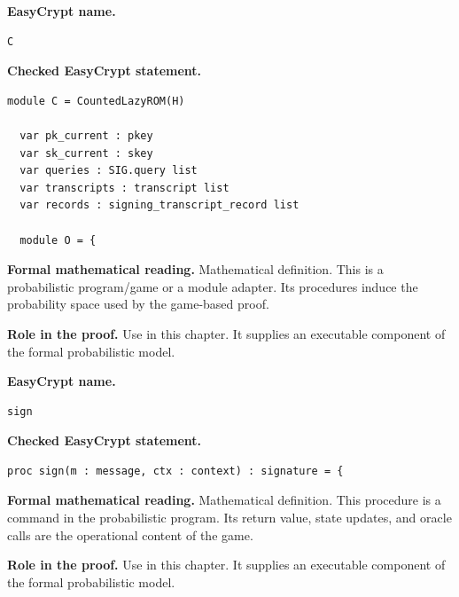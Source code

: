 \begin{formaldefinition}
\noindent\textbf{EasyCrypt name.}
\begin{lstlisting}[language=EasyCrypt,basicstyle=\ttfamily\scriptsize]
C
\end{lstlisting}
\noindent\textbf{Checked EasyCrypt statement.}
\begin{lstlisting}[language=EasyCrypt,basicstyle=\ttfamily\scriptsize]
module C = CountedLazyROM(H)

  var pk_current : pkey
  var sk_current : skey
  var queries : SIG.query list
  var transcripts : transcript list
  var records : signing_transcript_record list

  module O = {
\end{lstlisting}
\noindent\textbf{Formal mathematical reading.}
Mathematical definition. This is a probabilistic program/game or a module adapter.  Its procedures induce the probability space used by the game-based proof.

\noindent\textbf{Role in the proof.}
Use in this chapter. It supplies an executable component of the formal probabilistic model.

\end{formaldefinition}

\begin{formaldefinition}
\noindent\textbf{EasyCrypt name.}
\begin{lstlisting}[language=EasyCrypt,basicstyle=\ttfamily\scriptsize]
sign
\end{lstlisting}
\noindent\textbf{Checked EasyCrypt statement.}
\begin{lstlisting}[language=EasyCrypt,basicstyle=\ttfamily\scriptsize]
proc sign(m : message, ctx : context) : signature = {
\end{lstlisting}
\noindent\textbf{Formal mathematical reading.}
Mathematical definition. This procedure is a command in the probabilistic program.  Its return value, state updates, and oracle calls are the operational content of the game.

\noindent\textbf{Role in the proof.}
Use in this chapter. It supplies an executable component of the formal probabilistic model.

\end{formaldefinition}

